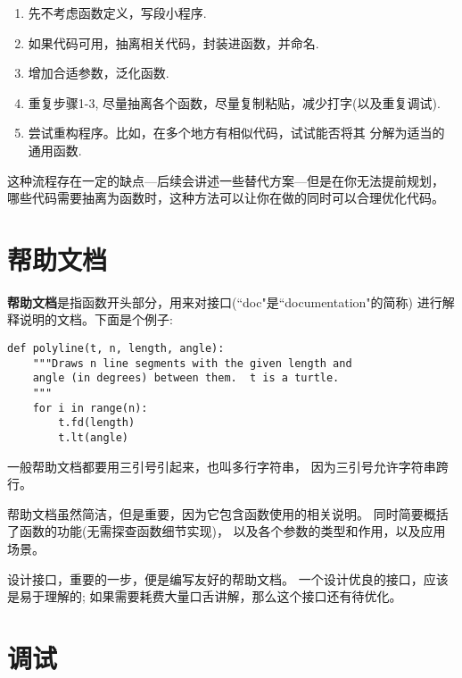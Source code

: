 \documentclass[10pt]{book}
\begin{document}
\begin{enumerate}

\item 先不考虑函数定义，写段小程序.

\item 如果代码可用，抽离相关代码，封装进函数，并命名.

\item 增加合适参数，泛化函数.

\item 重复步骤1-3, 尽量抽离各个函数，尽量复制粘贴，减少打字(以及重复调试).

\item 尝试重构程序。比如，在多个地方有相似代码，试试能否将其
分解为适当的通用函数.

\end{enumerate}

这种流程存在一定的缺点---后续会讲述一些替代方案---但是在你无法提前规划，
哪些代码需要抽离为函数时，这种方法可以让你在做的同时可以合理优化代码。

\section{帮助文档}
\label{docstring}
{\bf 帮助文档}是指函数开头部分，用来对接口(``doc"是``documentation"的简称)
进行解释说明的文档。下面是个例子:

\begin{verbatim}
def polyline(t, n, length, angle):
    """Draws n line segments with the given length and
    angle (in degrees) between them.  t is a turtle.
    """    
    for i in range(n):
        t.fd(length)
        t.lt(angle)
\end{verbatim}
%
一般帮助文档都要用三引号引起来，也叫多行字符串，
因为三引号允许字符串跨行。

帮助文档虽然简洁，但是重要，因为它包含函数使用的相关说明。
同时简要概括了函数的功能(无需探查函数细节实现)，
以及各个参数的类型和作用，以及应用场景。

设计接口，重要的一步，便是编写友好的帮助文档。
一个设计优良的接口，应该是易于理解的;
如果需要耗费大量口舌讲解，那么这个接口还有待优化。


\section{调试}
\end{document}
